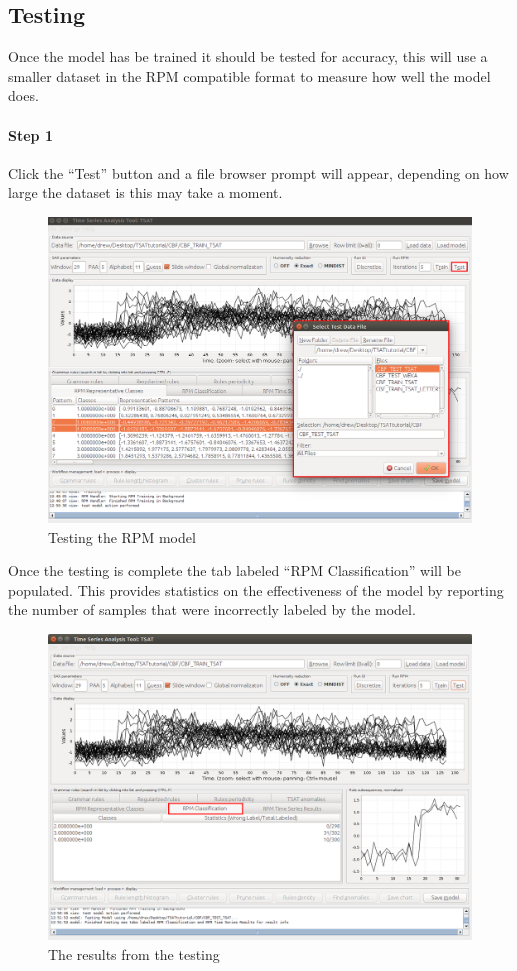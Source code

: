 \documentclass[titlepage, letterpaper, 12pt]{article}
\begin{document}
\subsection{Testing}
\label{RPMTest}
Once the model has be trained it should be tested for accuracy, this will use a smaller dataset in the RPM compatible format to measure how well the model does. 
\newpage
\paragraph{Step 1}
Click the ``Test'' button and a file browser prompt will appear, depending on how large the dataset is this may take a moment. 

\begin{figure}[H]
	\includegraphics[width=\textwidth]{TSAT-testing-step-1}
	\caption{Testing the RPM model}
	\label{fig:TSAT-testing-step-1}
\end{figure}

\newpage
Once the testing is complete the tab labeled ``RPM Classification'' will be populated. This provides statistics on the effectiveness of the model by reporting the number of samples that were incorrectly labeled by the model.

\begin{figure}[H]
	\includegraphics[width=\textwidth]{TSAT-testing-step-2}
	\caption{The results from the testing}
	\label{fig:TSAT-testing-step-2}
\end{figure}
\end{document}
